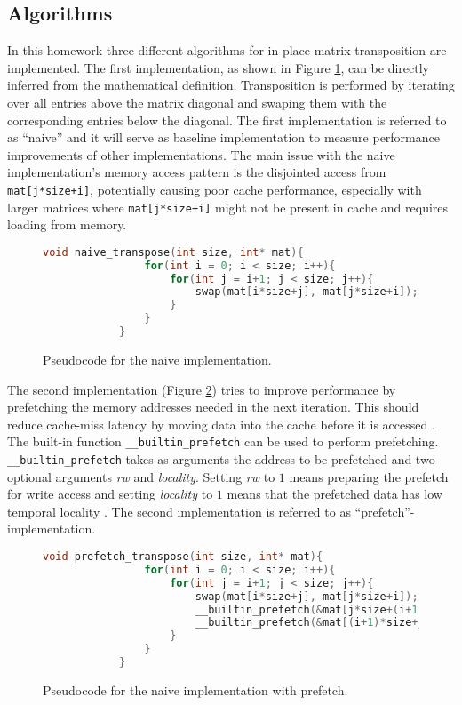 \documentclass{scrartcl}
\begin{document}
    \subsection{Algorithms}
    In this homework three different algorithms for in-place matrix transposition are implemented. The first implementation, as shown in Figure \ref{fig:naive_implementation}, can be directly inferred from the mathematical definition. Transposition is performed by iterating over all entries above the matrix diagonal and swaping them with the corresponding entries below the diagonal. The first implementation is referred to as ``naive'' and it will serve as baseline implementation to measure performance improvements of other implementations. 
    The main issue with the naive implementation's memory access pattern is the disjointed access from \lstinline{mat[j*size+i]}, potentially causing poor cache performance, especially with larger matrices where \lstinline{mat[j*size+i]} might not be present in cache and requires loading from memory.
    
    \begin{figure}
        \begin{lstlisting}[language=C]
            void naive_transpose(int size, int* mat){
                for(int i = 0; i < size; i++){
                    for(int j = i+1; j < size; j++){
                        swap(mat[i*size+j], mat[j*size+i]);
                    }
                }
            }
        \end{lstlisting}
        \caption{Pseudocode for the naive implementation.}
        \label{fig:naive_implementation}        
    \end{figure}

    The second implementation (Figure \ref{fig:prefetch_implementation}) tries to improve performance by prefetching the memory addresses needed in the next iteration. This should reduce cache-miss latency by moving data into the cache before it is accessed \cite{gccdocs}. The built-in function \lstinline{__builtin_prefetch} can be used to perform prefetching. \lstinline{__builtin_prefetch} takes as arguments the address to be prefetched and two optional arguments \textit{rw} and \textit{locality}. Setting \textit{rw} to $1$ means preparing the prefetch for write access and setting \textit{locality} to $1$ means that the prefetched data has low temporal locality \cite{gccdocs}. The second implementation is referred to as ``prefetch''-implementation.

    \begin{figure}
        \begin{lstlisting}[language=C]
            void prefetch_transpose(int size, int* mat){
                for(int i = 0; i < size; i++){
                    for(int j = i+1; j < size; j++){
                        swap(mat[i*size+j], mat[j*size+i]);
                        __builtin_prefetch(&mat[j*size+(i+1)], 1, 1);
                        __builtin_prefetch(&mat[(i+1)*size+j], 1, 1);
                    }
                }
            }
        \end{lstlisting}
        \caption{Pseudocode for the naive implementation with prefetch.}
        \label{fig:prefetch_implementation}        
    \end{figure}
\end{document}

